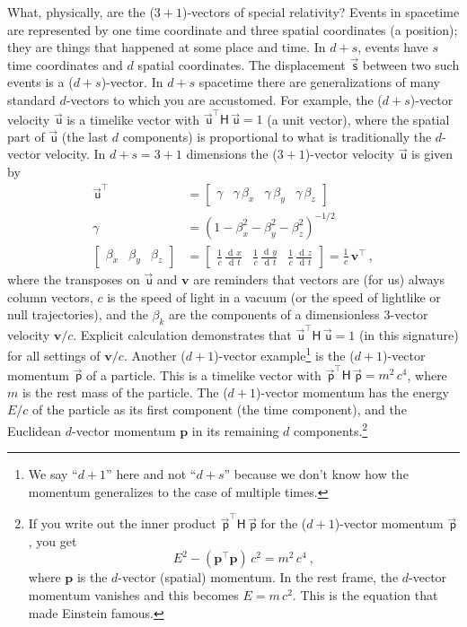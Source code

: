 \documentclass{article}
\newcommand{\metric}{\mathsf{H}}
\DeclareMathOperator{\dd}{d\!}
\newcommand\upvec[1]{\!\vec{\,\mathrm{#1}}}
\newcommand{\Evec}[1]{{\mathbf{#1}}} %
\newcommand{\Lvec}[1]{\upvec{\mathsf{#1}}} %
\newcommand{\plus}{\!+\!} %
\begin{document}
What, physically, are the ($3\plus 1$)-vectors of special relativity?
Events in spacetime are represented by one time coordinate and three spatial coordinates (a position); they are things that happened at some place and time.
In $d\plus s$, events have $s$ time coordinates and $d$ spatial coordinates.
The displacement $\Lvec{s}$ between two such events is a ($d\plus s$)-vector.
In $d\plus s$ spacetime there are generalizations of many standard $d$-vectors to which you are accustomed.
For example,
the ($d\plus s$)-vector velocity $\Lvec{u}$ is a timelike vector with $\Lvec{u}^\top\metric\,\Lvec{u}=1$ (a unit vector), where the spatial part of $\Lvec{u}$ (the last $d$ components) is proportional to what is traditionally the $d$-vector velocity.
In $d+s=3+1$ dimensions the ($3\plus1$)-vector velocity $\Lvec{u}$ is given by
\begin{align}
    \Lvec{u}^\top &= \begin{bmatrix} \gamma & \gamma\,\beta_x & \gamma\,\beta_y & \gamma\,\beta_z \end{bmatrix} \\
    \gamma &= (1 - \beta_x^2 - \beta_y^2 - \beta_z^2)^{-1/2} \nonumber\\
    \begin{bmatrix} \beta_x & \beta_y & \beta_z\end{bmatrix} &= \begin{bmatrix}\displaystyle\frac{1}{c}\,\frac{\dd x}{\dd t} & \displaystyle\frac{1}{c}\,\frac{\dd y}{\dd t} & \displaystyle\frac{1}{c}\,\frac{\dd z}{\dd t} \end{bmatrix} = \frac{1}{c}\,\Evec{v}^\top ~,\nonumber
\end{align}
where the transposes on $\Lvec{u}$ and $\Evec{v}$ are reminders that vectors are (for us) always column vectors,
$c$ is the speed of light in a vacuum (or the speed of lightlike or null trajectories),
and the $\beta_k$ are the components of a dimensionless 3-vector velocity $\Evec{v}/c$.
Explicit calculation demonstrates that $\Lvec{u}^\top\metric\,\Lvec{u}=1$ (in this signature) for all settings of $\Evec{v}/c$.
Another ($d\plus1$)-vector example\footnote{We say ``$d+1$'' here and not ``$d+s$'' because we don't know how the momentum generalizes to the case of multiple times.} is the ($d\plus1$)-vector momentum $\Lvec{p}$ of a particle.
This is a timelike vector with $\Lvec{p}^\top\metric\,\Lvec{p}=m^2\,c^4$, where $m$ is the rest mass of the particle.
The ($d\plus1$)-vector momentum has the energy $E / c$ of the particle as its first component (the time component), and the Euclidean $d$-vector momentum $\Evec{p}$ in its remaining $d$ components.\footnote{%
If you write out the inner product $\Lvec{p}^\top\metric\,\Lvec{p}$ for the ($d\plus1$)-vector momentum $\Lvec{p}$, you get $$E^2 - (\Evec{p}^\top\Evec{p})\,c^2 = m^2\,c^4~,$$ where $\Evec{p}$ is the $d$-vector (spatial) momentum. In the rest frame, the $d$-vector momentum vanishes and this becomes $E=m\,c^2$. This is the equation that made Einstein famous.}
\end{document}
